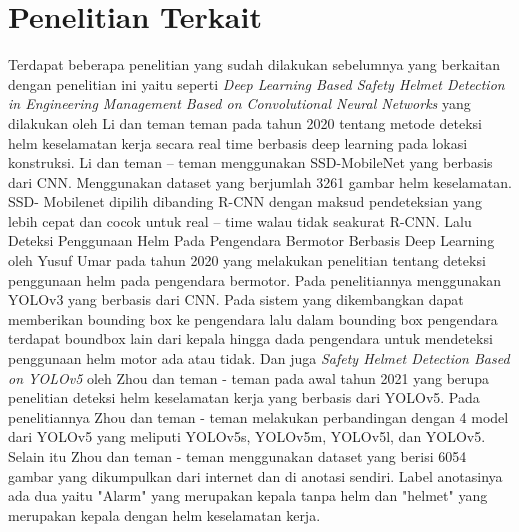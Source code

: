 \section{Penelitian Terkait}
\label{sec:penelitianterkait}

Terdapat beberapa penelitian yang sudah dilakukan sebelumnya yang berkaitan dengan penelitian ini yaitu seperti
\emph{Deep Learning Based Safety Helmet Detection in Engineering Management Based on Convolutional Neural Networks} yang dilakukan oleh
Li dan teman teman pada tahun 2020 tentang metode deteksi helm keselamatan kerja secara real time berbasis deep learning pada lokasi konstruksi. Li dan teman – teman menggunakan SSD-MobileNet yang berbasis dari CNN. Menggunakan dataset yang berjumlah 3261 gambar helm keselamatan. SSD- Mobilenet dipilih dibanding R-CNN dengan maksud pendeteksian yang lebih cepat dan cocok untuk real – time walau tidak seakurat R-CNN. \cite{li2020deep}
Lalu Deteksi Penggunaan Helm Pada Pengendara Bermotor Berbasis Deep Learning 
oleh Yusuf Umar pada tahun 2020 yang melakukan penelitian tentang deteksi penggunaan helm pada pengendara bermotor. Pada penelitiannya menggunakan YOLOv3 yang berbasis dari CNN. Pada sistem yang dikembangkan dapat memberikan bounding box ke pengendara lalu dalam bounding box pengendara terdapat boundbox lain dari kepala hingga dada pengendara untuk mendeteksi penggunaan helm motor ada atau tidak. \cite{hanafi2020deteksi}
Dan juga \emph{Safety Helmet Detection Based on YOLOv5} oleh Zhou dan teman - teman pada awal tahun 2021 yang berupa penelitian deteksi helm keselamatan kerja yang berbasis dari YOLOv5. Pada penelitiannya Zhou dan teman - teman melakukan perbandingan dengan 4 model dari YOLOv5 yang meliputi YOLOv5s, YOLOv5m, YOLOv5l, dan YOLOv5. Selain itu Zhou dan teman - teman menggunakan dataset yang berisi 6054 gambar yang dikumpulkan dari
internet dan di anotasi sendiri. Label anotasinya ada dua yaitu "Alarm" yang merupakan kepala tanpa helm dan
"helmet" yang merupakan kepala dengan helm keselamatan kerja\cite{zhou_zhao_nie_2021}.